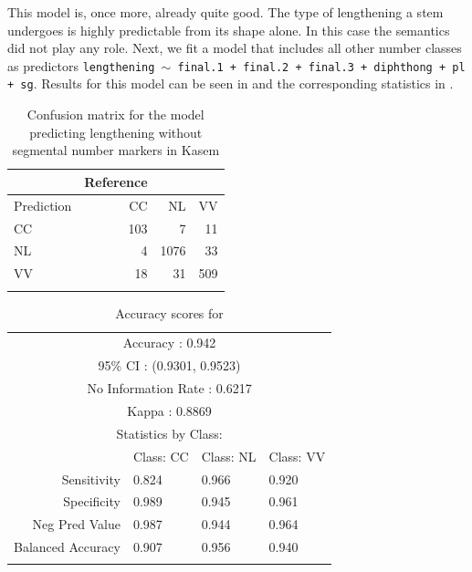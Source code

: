 This model is, once more, already quite good. The type of lengthening a stem undergoes is highly predictable from its shape alone. In this case the semantics did not play any role. Next, we fit a model that includes all other number classes as predictors \texttt{lengthening $\sim$ final.1 + final.2 + final.3 + diphthong + pl + sg}. Results for this model can be seen in  and the corresponding statistics in .

\begin{table}[p]
  \centering\small
  \begin{tabular}{lrrr}
    \lsptoprule
               & Reference        \\
    \midrule
    Prediction & CC  & NL   & VV  \\
    CC         & 103 & 7    & 11  \\
    NL         & 4   & 1076 & 33  \\
    VV         & 18  & 31   & 509 \\
    \lspbottomrule
  \end{tabular}
    \caption{Confusion matrix for the model predicting lengthening without segmental number markers in Kasem}
  \label{tab:length-kasem-2}
\end{table}

\begin{table}[p]
  \centering\small
  \begin{tabular}{rlll}
    \lsptoprule
    \multicolumn{4}{c}{Overall Statistics}           \\
    \midrule
    \multicolumn{4}{c}{Accuracy : 0.942}             \\
    \multicolumn{4}{c}{95\% CI : (0.9301, 0.9523)}   \\
    \multicolumn{4}{c}{No Information Rate : 0.6217} \\
    \multicolumn{4}{c}{Kappa : 0.8869}               \\
    \midrule
    \multicolumn{4}{c}{Statistics by Class:}         \\
    \midrule

                      & Class: CC & Class: NL & Class: VV \\
    Sensitivity       & 0.824     & 0.966     & 0.920     \\
    Specificity       & 0.989     & 0.945     & 0.961     \\
    Neg Pred Value    & 0.987     & 0.944     & 0.964     \\
    Balanced Accuracy & 0.907     & 0.956     & 0.940     \\
    \lspbottomrule
  \end{tabular}
    \caption{Accuracy scores for }\label{tab:length-kasem-2-stats}
\end{table}

